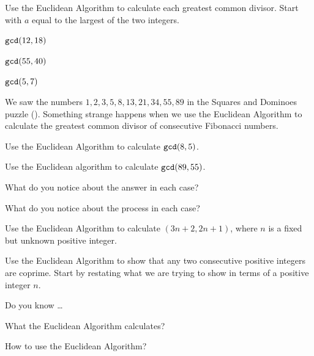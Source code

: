 \begin{exer}[\exerP] %
\label{exer_ea_examples}
    Use the Euclidean Algorithm to calculate each greatest common divisor. Start with $a$ equal to the largest of the two integers.
        \begin{exerpart}
            \item $\texttt{gcd}(12,18)$
            \item $\texttt{gcd}(55,40)$
            \item $\texttt{gcd}(5,7)$
        \end{exerpart}
\end{exer}

\begin{exer}[\exerU] %
\label{exer_ea_fib}
    We saw the  numbers $1, 2, 3, 5, 8, 13, 21, 34, 55, 89$ in the Squares and Dominoes puzzle ().  Something strange happens when we use the Euclidean Algorithm to calculate the greatest common divisor of consecutive Fibonacci numbers.
        \begin{apart}
            \item Use the Euclidean Algorithm to calculate $\texttt{gcd}(8,5)$.
            \item Use the Euclidean algorithm to calculate $\texttt{gcd}(89,55)$. 
            \item What do you notice about the answer in each case?
            \item What do you notice about the process in each case?
        \end{apart}
\end{exer}

\begin{exer}[\exerU] %
\label{exer_gcd_linears}
    Use the Euclidean Algorithm to calculate $(3n+2,2n+1)$, where $n$ is a fixed but unknown positive integer.   
\end{exer}

\begin{exer}[\exerU] %
\label{exer_consec_coprime}
    Use the Euclidean Algorithm to show that any two consecutive positive integers are coprime.  Start by restating what we are trying to show in terms of a positive integer $n$.     
\end{exer}

\begin{exer}[\exerR] %
\label{exer_dyk_euclidean_alg}
    Do you know \ldots
        \begin{exerpart}
            \item What the Euclidean Algorithm calculates?
            \item How to use the Euclidean Algorithm?
        \end{exerpart}
\end{exer}


